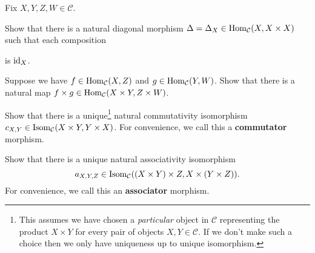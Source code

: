 \documentclass[11pt]{article}
\renewcommand{\C}{\mathcal{C}}
\begin{document}
\begin{exercise}
Fix $X,Y,Z,W\in\C$. 
\begin{enum}{\alph}
\item Show that there is a natural diagonal morphism $\Delta=\Delta_X\in\Hom_{\C}(X,X\times X)$ such that each composition
\begin{center}
\end{center}
is $\operatorname{id}_X$.

\item Suppose we have $f\in\Hom_{\C}(X,Z)$ and $g\in\Hom_{\C}(Y,W)$. Show that there is a natural map $f\times g\in\Hom_{\C}(X\times Y,Z\times W)$.

\item Show that there is a unique\footnote{This assumes we have chosen a \emph{particular} object in $\C$ representing the product $X\times Y$ for every pair of objects $X,Y\in\C$. If we don't make such a choice then we only have uniqueness up to unique isomorphism.} natural commutativity isomorphism $c_{X,Y}\in\Isom_{\C}(X\times Y,Y\times X)$. For convenience, we call this a \textbf{commutator} morphism.

\item Show that there is a unique natural associativity isomorphism 
$$a_{X,Y,Z}\in\Isom_{\C}((X\times Y)\times Z,X\times(Y\times Z)).$$
For convenience, we call this an \textbf{associator} morphism.
\end{enum}
\end{exercise}
\end{document}
